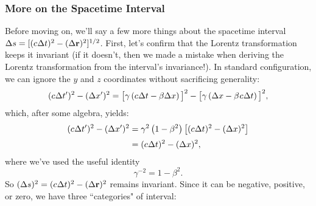 \documentclass[12pt]{article}
\renewcommand{\vv}[1]{\mathbf{#1}}
\begin{document}
\subsubsection{More on the Spacetime Interval}\label{sssec:sti2}
Before moving on, we'll say a few more things about the spacetime interval $\Delta s = [(c \mkern.5mu \Delta t)^2 - ( \Delta \vv r )^2]^{1/2}$. First, let's confirm that the Lorentz transformation keeps it invariant (if it doesn't, then we made a mistake when deriving the Lorentz transformation from the interval's invariance!). In standard configuration, we can ignore the $y$ and $z$ coordinates without sacrificing generality:
\begin{equation*}
(c \mkern.5mu \Delta t^{\prime})^2 - (\Delta x^{\prime})^2 = \big[ \gamma \left( c \mkern.5mu \Delta t - \beta \Delta x \right) \big] ^2 - \big[ \gamma \left( \Delta x - \beta \mkern1mu c \mkern.5mu \Delta t \right) \big]^2 ,
\end{equation*}
which, after some algebra, yields:
\begin{equation*}
\begin{aligned}
(c \mkern.5mu \Delta t^{\prime})^2 - (\Delta x^{\prime})^2 &= \gamma^2 \left( 1 - \beta^2 \right) \left[ (c \mkern.5mu \Delta t)^2 - ( \Delta x )^2 \right] \\[2pt]
&= (c \mkern.5mu \Delta t)^2 - ( \Delta x )^2 ,
\end{aligned}
\end{equation*}
where we've used the useful identity
\begin{equation}\label{eq:20}
\gamma^{-2} = 1 - \beta^2 .
\end{equation}
So $(\Delta s)^2 = (c \mkern.5mu \Delta t)^2 - ( \Delta \vv r )^2$ remains invariant. Since it can be negative, positive, or zero, we have three ``categories" of interval:
\end{document}
